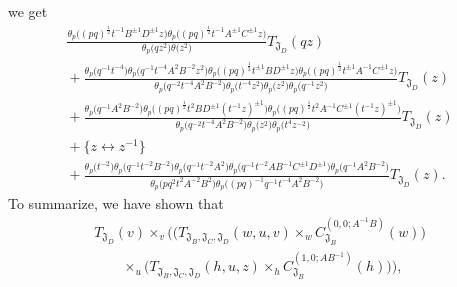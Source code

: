 \documentclass[a4paper,12pt]{article}
\begin{document}
 we get
\begin{gather*}
\frac{\theta_p\big((pq)^\frac{1}{2}t^{-1}B^{\pm1}D^{\pm1}z\big)
\theta_p\big((pq)^\frac{1}{2}t^{-1}A^{\pm1}C^{\pm1}z\big)}
{\theta_p\big(qz^2\big)\theta\big(z^2\big)}T_{{\mathfrak J}_D}(qz)\\
{}+ \frac{\theta_p\big(q^{-1}t^{-4}\big)\theta_p\big(q^{-1}t^{-4}A^2B^{-2}z^2\big)
\theta_p\big((pq)^\frac{1}{2}t^{\pm1}BD^{\pm1}z\big)
\theta_p\big((pq)^\frac{1}{2}t^{\pm1}A^{-1}C^{\pm1}z\big)}{\theta_p\big(q^{-2}t^{-4}A^{2}B^{-2}\big)
\theta_p\big(t^{-4}z^2\big)\theta_p\big(z^2\big)\theta_p\big(q^{-1}z^2\big)}T_{{\mathfrak J}_D}(z)\\
{}+ \frac{\theta_p\big(q^{-1}A^2B^{-2}\big)\theta_p\big((pq)^\frac{1}{2}t^2B D^{\pm1} (t^{-1}z)^{\pm1}\big)
\theta_p\big((pq)^\frac{1}{2}t^2 A^{-1} C^{\pm1} (t^{-1}z)^{\pm1}\big)}
{\theta_p\big(q^{-2}t^{-4}A^{2}B^{-2}\big)\theta_p\big(z^2\big)\theta_p\big(t^4z^{-2}\big)}T_{{\mathfrak J}_D}(z)\\
{}+ \big\{z\leftrightarrow z^{-1}\big\}\nonumber\\
{}+ \frac{\theta_p\big(t^{-2}\big)\theta_p\big(q^{-1}t^{-2}B^{-2}\big)\theta_p\big(q^{-1}t^{-2}A^2\big)
\theta_p\big(q^{-1}t^{-2}AB^{-1}C^{\pm1}D^{\pm1}\big)
\theta_p\big(q^{-1}A^2B^{-2}\big)} {\theta_p\big(pq^2t^2A^{-2}B^2\big)
\theta_p\big((pq)^{-1}q^{-1}t^{-4}A^2B^{-2}\big)} T_{{\mathfrak J}_D}(z) .
\end{gather*}
To summarize, we have shown that
\begin{gather*}
T_{{\mathfrak J}_D}(v)\times_v \big(\big(T_{{\mathfrak J}_B, {\mathfrak J}_C,{\mathfrak J}_D}(w,u,v)\times_w C^{(0,0;A^{-1}B)}_{{\mathfrak J}_B}(w)\big)\\
\qquad{} \times_u\big(T_{{\mathfrak J}_B, {\mathfrak J}_C,{\mathfrak J}_D}(h,u,z)\times_h C^{(1,0;AB^{-1})}_{{\mathfrak J}_B}(h)\big)\big) ,
\end{gather*}
\end{document}
